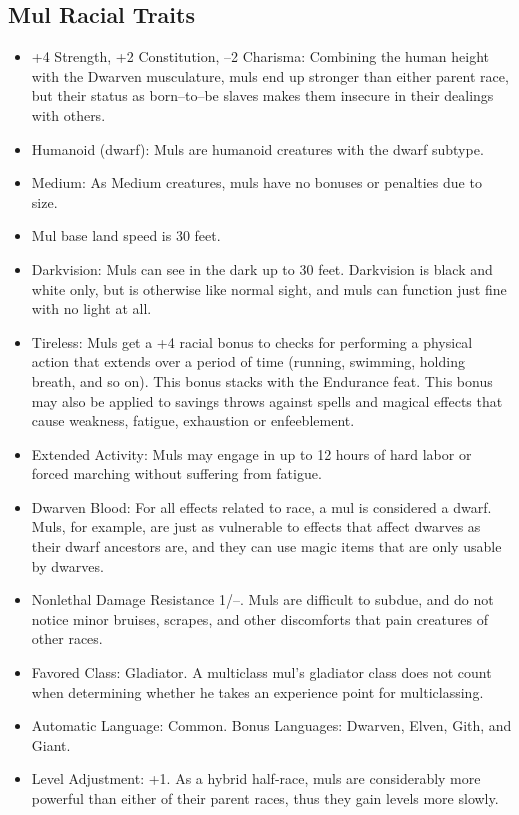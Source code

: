 \documentclass[10pt,a4paper,twocolumn]{d20}
\begin{document}
{\subsection{Mul Racial Traits}
\begin{itemize}
    \item +4 Strength, +2 Constitution, –2 Charisma: Combining the human height with the Dwarven musculature, muls end up stronger than either parent race, but their status as born–to–be slaves makes them insecure in their dealings with others.
    \item Humanoid (dwarf): Muls are humanoid creatures with the dwarf subtype.
    \item Medium: As Medium creatures, muls have no bonuses or penalties due to size.
    \item Mul base land speed is 30 feet.
    \item Darkvision: Muls can see in the dark up to 30 feet. Darkvision is black and white only, but is otherwise like normal sight, and muls can function just fine with no light at all.
    \item Tireless: Muls get a +4 racial bonus to checks for performing a physical action that extends over a period of time (running, swimming, holding breath, and so on). This bonus stacks with the Endurance feat. This bonus may also be applied to savings throws against spells and magical effects that cause weakness, fatigue, exhaustion or enfeeblement.
    \item Extended Activity: Muls may engage in up to 12 hours of hard labor or forced marching without suffering from fatigue.
    \item Dwarven Blood: For all effects related to race, a mul is considered a dwarf. Muls, for example, are just as vulnerable to effects that affect dwarves as their dwarf ancestors are, and they can use magic items that are only usable by dwarves.
    \item Nonlethal Damage Resistance 1/–. Muls are difficult to subdue, and do not notice minor bruises, scrapes, and other discomforts that pain creatures of other races.
    \item Favored Class: Gladiator. A multiclass mul’s gladiator class does not count when determining whether he takes an experience point for multiclassing.
    \item Automatic Language: Common. Bonus Languages: Dwarven, Elven, Gith, and Giant.
    \item Level Adjustment: +1. As a hybrid half‐race, muls are considerably more powerful than either of their parent races, thus they gain levels more slowly.
\end{itemize}

}
\end{document}
